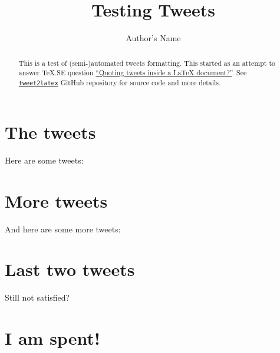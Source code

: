 \documentclass[twocolumn]{article}
\begin{document}
\title{Testing Tweets}
\author{Author's Name}

\maketitle

\begin{abstract}
  This is a test of (semi-)automated tweets formatting. This started as an
  attempt to answer \TeX .SE question
  \href{http://tex.stackexchange.com/q/323562/28495}{``Quoting tweets inside
    a \LaTeX{} document?''}. See
  \texttt{\href{https://github.com/wilx/tweet2latex}{tweet2latex}} GitHub
  repository for source code and more details.
\end{abstract}

\section{The tweets}\label{the-tweets}%
Here are some tweets:










\section{More tweets}\label{more-tweets}%
And here are some more tweets:








\section{Last two tweets}\label{last-two-tweets}%
Still not satisfied?




\section{I am spent!}\label{i-am-spent}%



\end{document}
